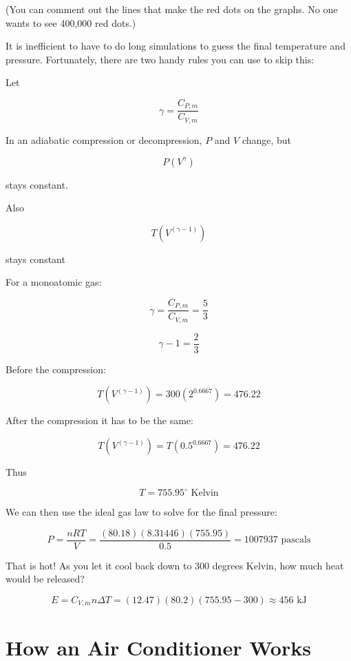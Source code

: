 (You can comment out the lines that make the red dots on the graphs. No
one wants to see 400,000 red dots.)

It is inefficient to have to do long simulations to guess the final temperature and pressure. Fortunately, there are two handy rules you can use to skip this:

\begin{mdframed}[style=important, frametitle={Adiabatic Compression and Decompression}]

Let 

$$\gamma = \frac{C_{P,m}}{C_{V,m}}$$

In an adiabatic compression or decompression, $P$ and $V$ change, but

$$P \left(V^\gamma \right)$$

stays constant.

Also 

$$T \left(V^{\left( \gamma - 1 \right)} \right)$$

stays constant

\end{mdframed}

For a monoatomic gas:

$$\gamma = \frac{C_{P,m}}{C_{V,m}} = \frac{5}{3}$$

$$\gamma - 1 = \frac{2}{3}$$

Before the compression: 

$$T \left(V^{\left( \gamma - 1 \right)} \right) = 300 \left( 2^{0.6667} \right) = 476.22$$

After the compression it has to be the same:

$$T \left(V^{\left( \gamma - 1 \right)} \right) = T \left( 0.5^{0.6667} \right) = 476.22$$

Thus 

$$T = 755.95^\circ \text{ Kelvin}$$

We can then use the ideal gas law to solve for the final pressure:

$$P = \frac{n R T}{V} = \frac{(80.18)(8.31446)(755.95)}{0.5} = 1007937 \text{ pascals}$$

That is hot! As you let it cool back down to 300 degrees Kelvin, how much heat would be released? 

$$E = C_{V,m} n \Delta T = (12.47)(80.2)(755.95 - 300) \approx 456 \text{ kJ}$$

\section{How an Air Conditioner Works}


